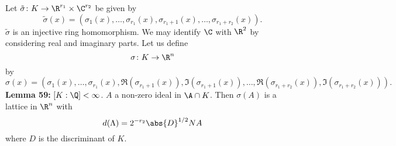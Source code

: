 Let $\tilde\sigma\colon K\to\R^{r_1}\times\C^{r_2}$ be given by
\[ \tilde\sigma(x) = (\sigma_1(x),\dotsc,\sigma_{r_1}(x),\sigma_{r_1+1}(x),\dotsc,\sigma_{r_1+r_2}(x)) . \]
$\tilde\sigma$ is an injective ring homomorphism.  We may identify $\C$ with $\R^2$ by considering real and imaginary parts.  Let us define
\[ \sigma\colon K\to\R^n \]
by
\[ \sigma(x) = (\sigma_1(x),\dotsc,\sigma_{r_1}(x),\Re(\sigma_{r_1+1}(x)),\Im(\sigma_{r_1+1}(x)),\dotsc,\Re(\sigma_{r_1+r_2}(x)),\Im(\sigma_{r_1+r_2}(x))) . \]
\textbf{Lemma 59:} $[K:\Q]<\infty$.  $A$ a non-zero ideal in $\A\cap K$.  Then $\sigma(A)$ is a lattice in $\R^n$ with
\[ d(\Lambda) = 2^{-r_2} \abs{D}^{1/2} NA \]
where $D$ is the discriminant of $K$.
